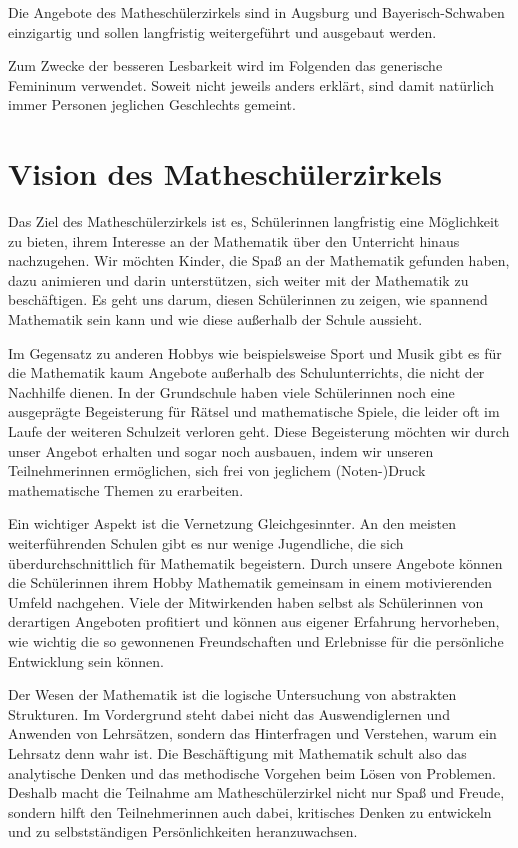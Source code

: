 \documentclass[12pt]{zettel}
\newcommand{\twopics}[2]{%
  \begin{figure}[b]
    \makebox[\textwidth][c]{%
      \texttt{[image: impressionen/\#1]}%
      \hspace*{1cm}%
      \texttt{[image: impressionen/\#2]}%
    }
  \end{figure}
}
\begin{document}
Die Angebote des Matheschülerzirkels sind in Augsburg und Bayerisch-Schwaben einzigartig
und sollen langfristig weitergeführt und ausgebaut werden.

Zum Zwecke der besseren Lesbarkeit wird im Folgenden das generische Femininum verwendet. Soweit nicht jeweils anders erklärt, sind damit natürlich immer Personen jeglichen
Geschlechts gemeint.

\tableofcontents


\section{Vision des Matheschülerzirkels}

Das Ziel des Matheschülerzirkels ist es, Schülerinnen langfristig eine Möglichkeit zu bieten, ihrem Interesse an der
Mathematik über den Unterricht hinaus nachzugehen. Wir möchten Kinder, die Spaß an der Mathematik gefunden haben, dazu animieren und darin unterstützen, sich weiter
mit der Mathematik zu beschäftigen. Es geht uns darum, diesen Schülerinnen zu zeigen, wie spannend Mathematik sein kann und wie diese außerhalb der Schule aussieht.

Im Gegensatz zu anderen Hobbys wie beispielsweise Sport und Musik gibt es für die Mathematik kaum Angebote außerhalb des Schulunterrichts, die nicht der Nachhilfe dienen.
In der Grundschule haben viele Schülerinnen noch eine ausgeprägte Begeisterung für 
Rätsel und mathematische Spiele, die leider oft im Laufe der weiteren
Schulzeit verloren geht. Diese Begeisterung möchten wir
durch unser Angebot erhalten und sogar noch ausbauen, indem wir
unseren Teilnehmerinnen ermöglichen, sich frei von jeglichem
(Noten-)Druck mathematische Themen zu erarbeiten.

\twopics{auftakt1}{auftakt2}

Ein wichtiger Aspekt ist die Vernetzung Gleichgesinnter. An
den meisten weiterführenden Schulen gibt es nur wenige Jugendliche, die sich überdurchschnittlich für Mathematik begeistern. Durch unsere Angebote können die
Schülerinnen ihrem Hobby Mathematik gemeinsam in einem motivierenden Umfeld nachgehen. Viele der Mitwirkenden haben selbst als Schülerinnen von derartigen Angeboten
profitiert und können aus eigener Erfahrung hervorheben, wie wichtig die so gewonnenen Freundschaften und Erlebnisse für die persönliche Entwicklung sein können.

Der Wesen der Mathematik ist die logische Untersuchung von abstrakten Strukturen. Im Vordergrund steht dabei nicht das Auswendiglernen und Anwenden von Lehrsätzen, sondern
das Hinterfragen und Verstehen, warum ein Lehrsatz denn wahr ist. Die Beschäftigung mit Mathematik schult also das analytische Denken und das methodische Vorgehen beim Lösen
von Problemen. Deshalb macht die Teilnahme am Matheschülerzirkel nicht nur Spaß und Freude, sondern hilft den Teilnehmerinnen auch dabei, kritisches Denken
zu entwickeln und zu selbstständigen Persönlichkeiten heranzuwachsen.
\end{document}
